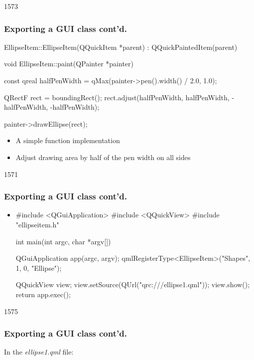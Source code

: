 \begin{slide}[fragile]{1573}\frametitle{Exporting a GUI class cont'd.}
\begin{cpp}
EllipseItem::EllipseItem(QQuickItem *parent)
    : QQuickPaintedItem(parent)
{
}

void EllipseItem::paint(QPainter *painter)
{
    const qreal halfPenWidth =
      qMax(painter->pen().width() / 2.0, 1.0);
    
    QRectF rect = boundingRect();
    rect.adjust(halfPenWidth, halfPenWidth,
                -halfPenWidth, -halfPenWidth);
    
    painter->drawEllipse(rect);
}
\end{cpp}
\begin{itemize}
\item A simple  function implementation
\item Adjust drawing area by half of the pen width on all sides
\end{itemize}
\end{slide}

\begin{slide}[fragile]{1571}\frametitle{Exporting a GUI class cont'd.}

\begin{itemize}
\item[]
\begin{cpp}
#include <QGuiApplication>
#include <QQuickView>
#include "ellipseitem.h"

int main(int argc, char *argv[])
{
    QGuiApplication app(argc, argv);
    qmlRegisterType<EllipseItem>("Shapes", 1, 0, "Ellipse");

    QQuickView view;
    view.setSource(QUrl("qrc:///ellipse1.qml"));
    view.show();
    return app.exec();
}
\end{cpp}

\end{itemize}
\end{slide}


\begin{slide}[fragile]{1575}\frametitle{Exporting a GUI class cont'd.}

In the \textit{ellipse1.qml} file:

\vspace*{0.5em}

\end{slide}

